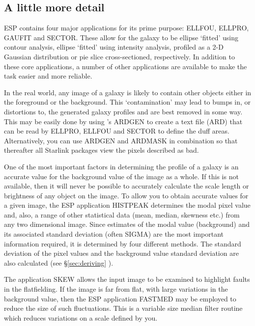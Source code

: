 \documentclass[twoside,11pt]{starlink}
\begin{document}
\subsection{A little more detail}

ESP contains four major applications for its prime purpose: ELLFOU,
ELLPRO, GAUFIT and SECTOR. These allow for the galaxy to be ellipse `fitted'
using contour analysis, ellipse `fitted' using intensity analysis,
profiled as a 2-D Gaussian distribution or pie slice cross-sectioned,
respectively. In addition to these core
applications, a number of other applications are available to make the
task easier and more reliable.

In the real world, any image of a galaxy is likely to contain other
objects either in the foreground or the background. This `contamination'
may lead to bumps in, or distortions to, the generated galaxy profiles and
are best removed in some way. This may be easily done by
using 's ARDGEN to create a text file (ARD) that can be read by
ELLPRO, ELLFOU and SECTOR to define the duff areas. Alternatively, you can
use ARDGEN and ARDMASK in combination so that thereafter all Starlink
packages view the pixels described as bad.

One of the most important factors in determining the profile of a
galaxy is an accurate value for the background value of the image as a
whole.  If this is not available, then it will never be possible to
accurately calculate the scale length or brightness of any object on
the image.  To allow you to obtain accurate values for a given image,
the ESP application HISTPEAK determines the modal pixel value and,
also, a range of other statistical data (mean, median, skewness etc.)
from any two dimensional image. Since estimates of the modal value
(background) and its associated standard deviation (often SIGMA) are the most
important information required, it is determined by four different
methods. The standard deviation of the pixel values and the background
value standard deviation are also calculated (see \S\ref{sec:deriving} ).

The application SKEW allows the input image to be examined to highlight
faults in the flatfielding.  If the image is far from flat, with large
variations in the background value, then the ESP application FASTMED
may be employed to reduce the size of such fluctuations. This is a
variable size median filter routine which reduces variations on a scale
defined by you.
\end{document}

